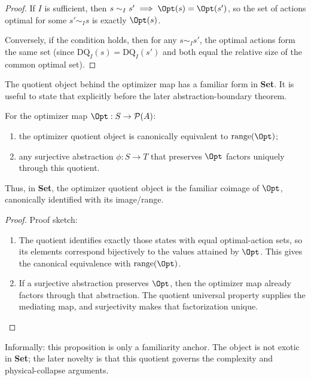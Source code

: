 \begin{proof}
If $I$ is sufficient, then $s \sim_I s' \implies \Opt(s) = \Opt(s')$, so the set of actions optimal for some $s' \sim_I s$ is exactly $\Opt(s)$.

Conversely, if the condition holds, then for any $s \sim_I s'$, the optimal actions form the same set (since $\text{DQ}_I(s) = \text{DQ}_I(s')$ and both equal the relative size of the common optimal set).
\end{proof}

The quotient object behind the optimizer map has a familiar form in \textbf{Set}. It is useful to state that explicitly before the later abstraction-boundary theorem.

\begin{proposition}\label{prop:optimizer-coimage}
For the optimizer map $\Opt : S \to \mathcal{P}(A)$:
\begin{enumerate}
\item the optimizer quotient object is canonically equivalent to $\mathrm{range}(\Opt)$;
\item any surjective abstraction $\phi : S \to T$ that preserves $\Opt$ factors uniquely through this quotient.
\end{enumerate}
Thus, in \textbf{Set}, the optimizer quotient object is the familiar coimage of $\Opt$, canonically identified with its image/range.\cite{maclane1998categories}
\end{proposition}

\begin{proof}
Proof sketch:
\begin{enumerate}
\item The quotient identifies exactly those states with equal optimal-action sets, so its elements correspond bijectively to the values attained by $\Opt$. This gives the canonical equivalence with $\mathrm{range}(\Opt)$.
\item If a surjective abstraction preserves $\Opt$, then the optimizer map already factors through that abstraction. The quotient universal property supplies the mediating map, and surjectivity makes that factorization unique.
\end{enumerate}
\end{proof}

Informally: this proposition is only a familiarity anchor. The object is not exotic in \textbf{Set}; the later novelty is that this quotient governs the complexity and physical-collapse arguments.

